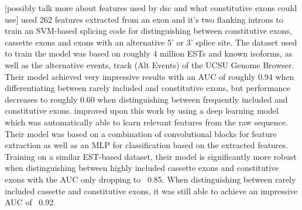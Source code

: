 [possibly talk more about features used by dsc and what constitutive exons could use]
\cite{buschhertel} used 262 features extracted from an exon and it's two flanking introns to train an SVM-based splicing code for distinguishing between constitutive exons, cassette exons and exons with an alternative 5' or 3' splice site. The dataset used to train the model was based on roughly 4 million ESTs and known isoforms, as well as the alternative events, track (Alt Events) of the UCSU Genome Browser.
Their model achieved very impressive results with an AUC of roughly 0.94 when differentiating between rarely included and constitutive exons, but performance decreases to roughly 0.60 when distinguishing between frequently included and constitutive exons. \cite{dsc} improved upon this work by using a deep learning model which was automatically able to learn relevant features from the raw sequence. Their model was based on a combination of convolutional blocks for feature extraction as well as an MLP for classification based on the extracted features. Training on a similar EST-based dataset, their model is significantly more robust when distinguishing between highly included cassette exons and constitutive exons with the AUC only dropping to ~0.85. When distinguishing between rarely included cassette and constitutive exons, it was still able to achieve an impressive AUC of ~0.92.
